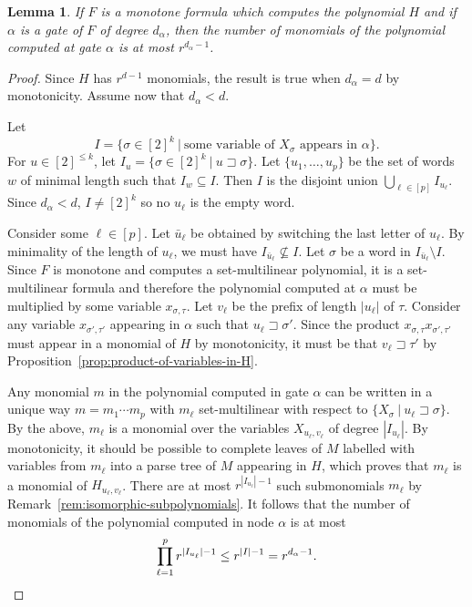 \documentclass[11pt,a4paper]{article}
\newtheorem{lemma}[theorem]{Lemma}
\newcommand{\prefix}{\sqsupset}
\begin{document}
\begin{lemma}\label{lem:number-of-monomials}
	If \(F\) is a monotone formula which computes the polynomial \(H\) and if \(\alpha\) is a gate of \(F\) of degree \(d_{\alpha}\), then the number of monomials of the polynomial computed at gate \(\alpha\) is at most \(r^{d_{\alpha}-1}\).
\end{lemma}

\begin{proof}
	Since \(H\) has \(r^{d-1}\) monomials, the result is true when \(d_{\alpha} = d\) by monotonicity. Assume now that \(d_{\alpha} < d\). 
	
	Let $$I = \{ \sigma \in [2]^k\ |\ \text{some variable of $X_\sigma$ appears in $\alpha$}\}.$$
	For $u \in [2]^{\leqslant k}$, let $I_u = \{ \sigma \in [2]^k\ |\ u \prefix \sigma\}$.
	Let $\{u_1, \ldots, u_p\}$ be the set of words $w$ of minimal length such that $I_w \subseteq I$.
	Then $I$ is the disjoint union $\bigcup_{\ell \in [p]} I_{u_\ell}$.
	Since $d_\alpha<d$, $I \neq [2]^k$ so no $u_\ell$ is the empty word.
	
	Consider some $\ell \in [p]$.
	Let $\bar{u}_\ell$ be obtained by switching the last letter of $u_\ell$.
	By minimality of the length of $u_\ell$, we must have $I_{\bar{u}_\ell} \nsubseteq I$. 
	Let $\sigma$ be a word in   $I_{\bar{u}_\ell} \setminus I$. 
	Since $F$ is monotone and computes a set-multilinear polynomial, it is a set-multilinear formula
	and therefore the polynomial computed at $\alpha$
	must be multiplied by some variable $x_{\sigma,\tau}$.
	Let $v_\ell$ be the prefix of length $|u_\ell|$ of $\tau$.
	Consider any variable $x_{\sigma',\tau'}$ appearing in $\alpha$ such that $u_\ell \prefix \sigma'$.
	Since the product $x_{\sigma,\tau} x_{\sigma',\tau'}$ must appear in a monomial of $H$ by monotonicity,
	it must be that $v_\ell \prefix \tau'$
	by Proposition~\ref{prop:product-of-variables-in-H}.
	
	
	Any monomial $m$ in the polynomial computed in gate $\alpha$ can be written in a unique way $m=m_1 \cdots m_p$ with $m_\ell$
	set-multilinear with respect to $\{X_{\sigma}\ |\ u_\ell \prefix \sigma\}$.
	By the above, $m_\ell$ is a monomial over the variables $X_{u_\ell,v_\ell}$ of degree $|I_{u_\ell}|$.
	By monotonicity, it should be possible to complete leaves of $M$ labelled with variables from $m_\ell$
	into a parse tree of $M$ appearing in $H$, which proves that 
	$m_\ell$ is a monomial of $H_{u_\ell,v_\ell}$.
	There are at most $r^{|I_{u_\ell}|-1}$ such submonomials $m_\ell$ by Remark~\ref{rem:isomorphic-subpolynomials}.
	It follows that the number of monomials of the polynomial computed in node $\alpha$ is at most
	\[
	\prod_{\ell=1}^p r^{\lvert I_{u_{\ell}} \rvert -1} \leq r^{\lvert I \rvert -1} = r^{d_\alpha-1}.\qedhere
	\]
\end{proof}	
\end{document}
